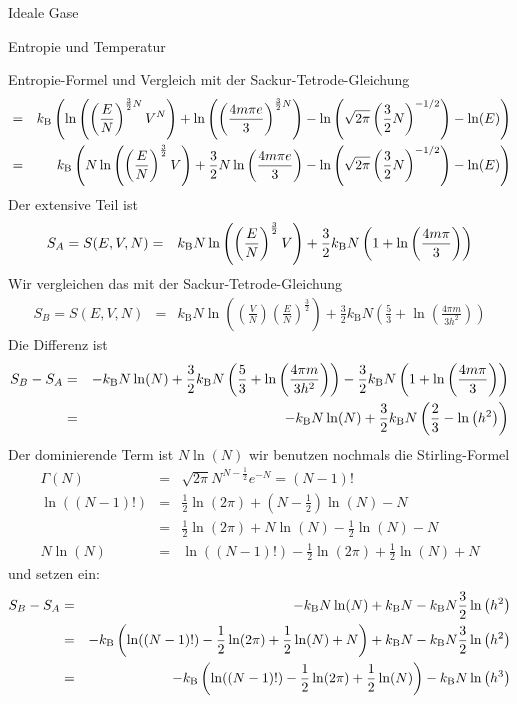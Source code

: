 \begin{chapter}{\titlestr}
\begin{section}{Ideale Gase}
\begin{subsection}{Entropie und Temperatur}
\begin{subsubsection}{Entropie-Formel und Vergleich mit der Sackur-Tetrode-Gleichung}
\begin{eqnarray*}
&=& k_{\mathrm{B}} \left(
\ln\left(\left(\frac{E}{N}\right)^{\frac{3}{2}N}V^N\right)
+\ln\left(\left(\frac{4m\pi e}{3}\right)^{\frac{3}{2}N}\right)
-\ln\left(\sqrt{2\pi}\left(\frac{3}{2}N\right)^{-1/2}\right)-\ln(E)\right)\\
&=& k_{\mathrm{B}} \left(
N\ln\left(\left(\frac{E}{N}\right)^{\frac{3}{2}}V\right)
+\frac{3}{2}N\ln\left(\frac{4m\pi e}{3}\right)
-\ln\left(\sqrt{2\pi}\left(\frac{3}{2}N\right)^{-1/2}\right)-\ln(E)\right)
\end{eqnarray*}
Der extensive Teil ist
\begin{eqnarray*}
S_A = S(E,V,N) &=&k_{\mathrm{B}} N\ln\left(\left(\frac{E}{N}\right)^{\frac{3}{2}}V\right)
+\frac{3}{2}k_{\mathrm{B}} N\left(1+\ln\left(\frac{4m\pi}{3}\right)\right)
\end{eqnarray*}
Wir vergleichen das mit der Sackur-Tetrode-Gleichung
\begin{eqnarray*}
S_B = S(E,V,N) &=& k_\mathrm{B} N \ln \left( \left(\frac VN\right) \left(\frac EN \right)^{\frac 32}\right)+ {\frac 32}k_\mathrm{B} N\left( {\frac 53}+ \ln\left(\frac{4\pi m}{3h^2}\right)\right)
\end{eqnarray*}
Die Differenz ist
\begin{eqnarray*}
S_B-S_A &=& - k_{\mathrm{B}}  N \ln (N)+{\frac 32}k_\mathrm{B} N\left( {\frac 53}+ \ln\left(\frac{4\pi m}{3h^2}\right)\right)
-\frac{3}{2}k_{\mathrm{B}} N\left(1+\ln\left(\frac{4m\pi}{3}\right)\right)\\
&=& - k_{\mathrm{B}}  N \ln (N)+\frac{3}{2}k_{\mathrm{B}} N\left(\frac{2}{3}-\ln\left(h^2\right)\right)
\end{eqnarray*}
Der dominierende Term ist $N \ln (N)$ wir benutzen nochmals die Stirling-Formel
\begin{eqnarray*}
\Gamma(N) &=& \sqrt{2\pi}N^{N-\frac{1}{2}}e^{-N}=(N-1)!\\
\ln((N-1)!) &=& \frac{1}{2}\ln(2\pi)+\left(N-\frac{1}{2}\right)\ln(N)-N\\
&=& \frac{1}{2}\ln(2\pi)+N\ln(N)-\frac{1}{2}\ln(N)-N\\
N\ln(N) &=&\ln((N-1)!)-\frac{1}{2}\ln(2\pi)+\frac{1}{2}\ln(N)+N
\end{eqnarray*}
und setzen ein:
\begin{eqnarray*}
S_B-S_A &=&- \kb  N \ln (N)+\kb N-\kb N\frac{3}{2}\ln\left(h^2\right)\\
&=&- \kb  \left(\ln((N-1)!)-\frac{1}{2}\ln(2\pi)+\frac{1}{2}\ln(N)+N\right)+\kb N-\kb N\frac{3}{2}\ln\left(h^2\right)\\
&=&- \kb  \left(\ln((N-1)!)-\frac{1}{2}\ln(2\pi)+\frac{1}{2}\ln(N)\right)-\kb N\ln\left(h^3\right)\\

\end{eqnarray*}
\end{subsubsection}
\end{subsection}
\end{section}
\end{chapter}
